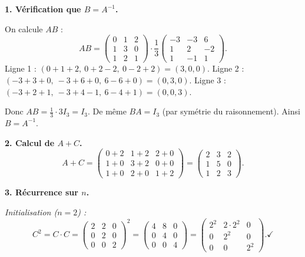 \begin{solution}
	\textbf{1. Vérification que $B = A^{-1}$.}
	
	On calcule $AB$ :
	\[
	AB = \begin{pmatrix}0&1&2\\1&3&0\\1&2&1\end{pmatrix}
	\cdot\frac{1}{3}\begin{pmatrix}-3&-3&6\\1&2&-2\\1&-1&1\end{pmatrix}.
	\]
	Ligne 1 : $(0+1+2,\ 0+2-2,\ 0-2+2)=(3,0,0)$.
	Ligne 2 : $(-3+3+0,\ -3+6+0,\ 6-6+0)=(0,3,0)$.
	Ligne 3 : $(-3+2+1,\ -3+4-1,\ 6-4+1)=(0,0,3)$.
	
	Donc $AB = \frac{1}{3}\cdot 3I_3 = I_3$. De même $BA=I_3$ (par symétrie du raisonnement).
	Ainsi $B = A^{-1}$. \checkmark
	
	\textbf{2. Calcul de $A+C$.}
	\[
	A+C = \begin{pmatrix}0+2&1+2&2+0\\1+0&3+2&0+0\\1+0&2+0&1+2\end{pmatrix}
	= \begin{pmatrix}2&3&2\\1&5&0\\1&2&3\end{pmatrix}.
	\]
	
	\textbf{3. Récurrence sur $n$.}
	
	\textit{Initialisation ($n=2$) :}
	\[
	C^2 = C\cdot C =
	\begin{pmatrix}2&2&0\\0&2&0\\0&0&2\end{pmatrix}^2
	= \begin{pmatrix}4&8&0\\0&4&0\\0&0&4\end{pmatrix}
	= \begin{pmatrix}2^2&2\cdot2^2&0\\0&2^2&0\\0&0&2^2\end{pmatrix}. \checkmark
	\]
	

\end{solution}
